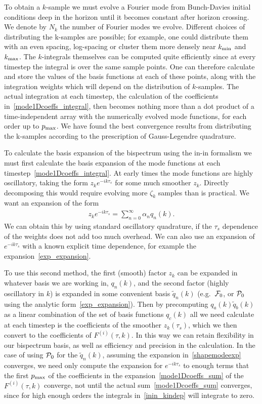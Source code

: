 To obtain a $k$-sample we must evolve a Fourier mode from Bunch-Davies initial conditions deep in the horizon
until it becomes constant after horizon crossing.
We denote by $N_k$ the number of Fourier modes we evolve.
Different choices of distributing the k-samples are possible; for example, one could distribute them
with an even spacing, log-spacing or cluster them more densely near ${k_\text{min}}$ and ${k_\text{max}}$.
The $k$-integrals themselves can be computed quite efficiently since
at every timestep the integral is over the same sample points.
One can therefore calculate and store the values of the basis functions at each of these points,
along with the integration weights which will depend on the distribution of $k$-samples.
The actual integration at each timestep, the calculation of the 
coefficients in~\eqref{mode1Dcoeffs_integral}, then becomes nothing more
than a dot product of a time-independent array with the
numerically evolved mode functions, for each order up to $p_\text{max}$.
We have found the best convergence results from distributing the k-samples
according to the prescription of Gauss-Legendre quadrature.


To calculate the basis expansion of the bispectrum using the in-in formalism
we must first calculate the basis expansion of the mode
functions at each timestep~\eqref{mode1Dcoeffs_integral}.
At early times the mode functions are highly oscillatory, taking the form $z_k e^{-ik\tau_s}$
for some much smoother $z_k$.
Directly decomposing this would require evolving more $\zeta_k$ samples
than is practical.
We want an expansion of the form
\begin{align}\label{mode_expansion}
	z_k e^{-ik\tau_s} = \sum_{n=0}^{\infty}\alpha_n q_n(k).
\end{align}
We can obtain this by using standard oscillatory
quadrature, if the $\tau_s$ dependence of the weights does not add too much overhead.
We can also use an expansion of $e^{-ik\tau_s}$
with a known explicit time dependence, for example
the expansion~\eqref{exp_expansion}.


To use this second method,
the first (smooth) factor $z_k$ can be expanded in whatever basis we are working in, $q_n(k)$,
and the second factor (highly oscillatory in $k$) is expanded
in some convenient basis $\tilde{q}_n(k)$
(e.g.\ $\mathcal{F}_0$, or $\mathcal{P}_0$ using the analytic form~\eqref{exp_expansion}).
Then by precomputing
$q_a(k)\tilde{q}_b(k)$
as a linear combination of the set of basis functions $q_c(k)$
all we need calculate at each timestep is the coefficients
of the smoother $z_k(\tau_s)$, which we then convert to the coefficients
of $F^{(i)}(\tau, k)$. In this way we can retain flexibility in our
bispectrum basis, as well as efficiency and precision in the calculation.
In the case of using $\mathcal{P}_0$ for the $\tilde{q}_n(k)$,
assuming the expansion in~\eqref{shapemodeexp} converges,
we need only compute the expansion for $e^{-ik\tau_s}$ to enough
terms that the first $p_\text{max}$ of the
coefficients in the expansion~\eqref{mode1Dcoeffs_sum} of the $F^{(i)}(\tau, k)$ converge,
not until the actual sum~\eqref{mode1Dcoeffs_sum} converges, since for high enough orders the integrals
in~\eqref{inin_kindep} will integrate to zero.


